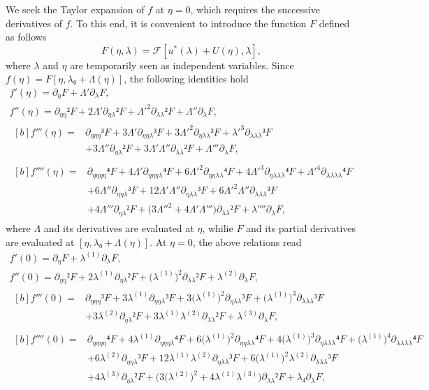 \documentclass[12pt, final]{scrartcl}
\theoremstyle{definition}
\newcommand{\order}[2][1]{#2^{(#1)}}
\begin{document}
We seek the Taylor expansion of $f$ at $η = 0$, which requires the
successive derivatives of $f$. To this end, it is convenient to introduce the
function $F$ defined as follows
\begin{equation*}
  F(η, λ) =\mathcal{F}[u^{\ast}(λ) + U(η), λ],
\end{equation*}
where $λ$ and $η$ are temporarily seen as independent variables. Since
$f(η) = F[η, λ₀ + Λ(η)]$, the following identities hold
\begin{gather*}
  f'(η) = ∂_{η} F + Λ' ∂_{λ} F,\\
  f''(η) = ∂_{ηη}² F + 2Λ' ∂_{ηλ}²F + Λ'^2 ∂_{λλ}² F + Λ'' ∂_{λ} F,\\
  \begin{aligned}[b]
    f'''(η) ={}
    & ∂_{ηηη}³ F + 3Λ' ∂_{ηηλ}³F + 3Λ'^2 ∂_{ηλλ}³F + λ'^3 ∂_{λλλ}³ F\\
    & + 3Λ'' ∂_{ηλ}² F + 3Λ' Λ'' ∂_{λ λ}² F + Λ''' ∂_{λ} F,
  \end{aligned}\\
  \begin{aligned}[b]
    f''''(η) ={}
    & ∂_{ηηηη}⁴ F + 4Λ' ∂_{ηηηλ}⁴F + 6Λ'^2 ∂_{ηηλλ}⁴F + 4Λ'^3 ∂_{ηλλλ}⁴F + Λ'^4 ∂_{λλλλ}⁴ F\\
    & + 6Λ'' ∂_{ηηλ}³ F + 12Λ' Λ'' ∂_{ηλλ}³F + 6Λ'^2 Λ'' ∂_{λλλ}³ F\\
    & + 4 Λ''' ∂_{ηλ}² F + \bigl( 3Λ''^2 + 4 Λ' Λ''' \bigr) ∂_{λλ}² F + λ'''' ∂_{λ}F,
  \end{aligned}
\end{gather*}
where $Λ$ and its derivatives are evaluated at $η$, whilie $F$ and its
partial derivatives are evaluated at $[η, λ₀ + Λ(η)]$. At $η = 0$, the above
relations read
\begin{gather}
  \label{eq:20220107060454}
  f'(0) = ∂_{η} F + \order[1]λ ∂_{λ} F,\\
  \label{eq:20220107124311}
  f''(0) = ∂_{ηη}² F + 2 \order[1]λ ∂_{ηλ}² F + \bigl( \order[1]λ \bigr)^2 ∂_{λλ}² F + \order[2]λ ∂_{λ} F,\\
  \label{eq:20220107060500}
  \begin{aligned}[b]
    f'''(0) ={}
    & ∂_{ηηη}³ F + 3 \order[1]λ ∂_{ηηλ}³ F + 3 \bigl( \order[1]λ \bigr)^2 ∂_{ηλλ}³ F + \bigl( \order[1]λ \bigr)^3 ∂_{λλλ}³ F\\
    & + 3 \order[2]λ ∂_{ηλ}² F + 3 \order[1]λ \order[2]λ ∂_{λλ}² F + \order[3]λ ∂_{λ} F,
  \end{aligned}\\
  \label{eq:20220602185935}
  \begin{aligned}[b]
    f''''(0) ={}
    & ∂_{ηηηη}⁴F + 4 \order[1]λ ∂_{ηηηλ}⁴ F + 6 \bigl( \order[1]λ \bigr)^2 ∂_{ηηλλ}⁴ F + 4 \bigl( \order[1]λ \bigr)^3 ∂_{ηλλλ}⁴ F + \bigl( \order[1]λ \bigr)^4 ∂_{λλλλ}⁴ F\\
    & + 6 \order[2]λ ∂_{ηηλ}³ F + 12 \order[1]λ \order[2]λ ∂_{ηλλ}³ F + 6 \bigl( \order[1]λ \bigr)^2 \order[2]λ ∂_{λλλ}³ F\\
    & + 4 \order[3]λ ∂_{ηλ}² F + \bigl(3 \bigl( \order[2]λ \bigr)^2 + 4 \order[1]λ \order[3]λ\bigr) ∂_{λλ}² F + λ₄ ∂_{λ} F,
  \end{aligned}
\end{gather}
\end{document}
